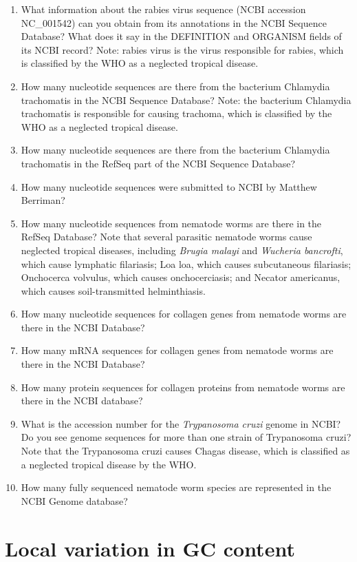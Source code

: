 \documentclass[
]{book}
\providecommand{\tightlist}{%
  \setlength{\itemsep}{0pt}\setlength{\parskip}{0pt}}
\begin{document}
\begin{enumerate}
\def\labelenumi{\arabic{enumi}.}
\tightlist
\item
  What information about the rabies virus sequence (NCBI accession NC\_001542) can you obtain from its annotations in the NCBI Sequence Database?
  What does it say in the DEFINITION and ORGANISM fields of its NCBI record? Note: rabies virus is the virus responsible for rabies, which is classified by the WHO as a neglected tropical disease.
\item
  How many nucleotide sequences are there from the bacterium Chlamydia trachomatis in the NCBI Sequence Database?
  Note: the bacterium Chlamydia trachomatis is responsible for causing trachoma, which is classified by the WHO as a neglected tropical disease.
\item
  How many nucleotide sequences are there from the bacterium Chlamydia trachomatis in the RefSeq part of the NCBI Sequence Database?
\item
  How many nucleotide sequences were submitted to NCBI by Matthew Berriman?
\item
  How many nucleotide sequences from nematode worms are there in the RefSeq Database?
  Note that several parasitic nematode worms cause neglected tropical diseases, including \emph{Brugia malayi} and \emph{Wucheria bancrofti}, which cause lymphatic filariasis; Loa loa, which causes subcutaneous filariasis; Onchocerca volvulus, which causes onchocerciasis; and Necator americanus, which causes soil-transmitted helminthiasis.
\item
  How many nucleotide sequences for collagen genes from nematode worms are there in the NCBI Database?
\item
  How many mRNA sequences for collagen genes from nematode worms are there in the NCBI Database?
\item
  How many protein sequences for collagen proteins from nematode worms are there in the NCBI database?
\item
  What is the accession number for the \emph{Trypanosoma cruzi} genome in NCBI?
  Do you see genome sequences for more than one strain of Trypanosoma cruzi? Note that the Trypanosoma cruzi causes Chagas disease, which is classified as a neglected tropical disease by the WHO.
\item
  How many fully sequenced nematode worm species are represented in the NCBI Genome database?
\end{enumerate}

\hypertarget{local-variation-in-gc-content}{%
\chapter{Local variation in GC content}\label{local-variation-in-gc-content}}
\end{document}
